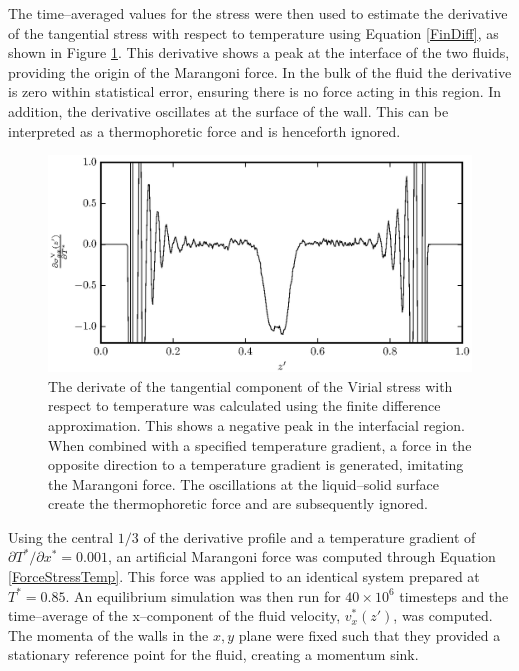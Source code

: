 The time--averaged values for the stress were then used to estimate the derivative of the tangential stress with respect to temperature using Equation \ref{FinDiff}, as shown in Figure \ref{PisVirForce}.
This derivative shows a peak at the interface of the two fluids, providing the origin of the Marangoni force.
In the bulk of the fluid the derivative is zero within statistical error, ensuring there is no force acting in this region.
In addition, the derivative oscillates at the surface of the wall.
This can be interpreted as a thermophoretic force and is henceforth ignored.

\begin{figure}[h]
\centering
\includegraphics[scale=1.0]{PisVirForce}
\caption{The derivate of the tangential component of the Virial stress with respect to temperature was calculated using the finite difference approximation.
This shows a negative peak in the interfacial region.
When combined with a specified temperature gradient, a force in the opposite direction to a temperature gradient is generated, imitating the Marangoni force.
The oscillations at the liquid--solid surface create the thermophoretic force and are subsequently ignored.}
\label{PisVirForce}
\end{figure}
\FloatBarrier

Using the central $1/3$ of the derivative profile and a temperature gradient of $\partial T^{*} / \partial x^{*} = 0.001$, an artificial Marangoni force was computed through Equation \ref{ForceStressTemp}.
This force was applied to an identical system prepared at $T^{*} = 0.85$.
An equilibrium simulation was then run for $40 \times 10^{6}$ timesteps and the time--average of the x--component of the fluid velocity, $v^{*}_{x}(z')$, was computed.
The momenta of the walls in the $x,y$ plane were fixed such that they provided a stationary reference point for the fluid, creating a momentum sink.

